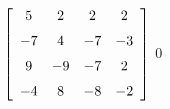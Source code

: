 {$\left[ \begin {array}{cccc} 5&2&2&2\\\noalign{\medskip}-7&4&-7&-3
\\\noalign{\medskip}9&-9&-7&2\\\noalign{\medskip}-4&8&-8&-2
\end {array} \right]$} 
{$0$}



  

